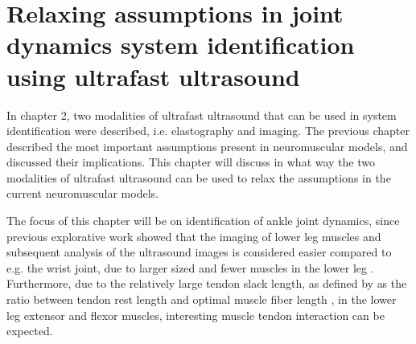\chapter{Relaxing assumptions in joint dynamics system identification using ultrafast ultrasound}
\label{chap:remove_assumptions}

In chapter 2, two modalities of ultrafast ultrasound that can be used in system identification were described, i.e. elastography and imaging. The previous chapter described the most important assumptions present in neuromuscular models, and discussed their implications. This chapter will discuss in what way the two modalities of ultrafast ultrasound can be used to relax the assumptions in the current neuromuscular models.

The focus of this chapter will be on identification of ankle joint dynamics, since previous explorative work showed that the imaging of lower leg muscles and subsequent analysis of the ultrasound images is considered easier compared to e.g. the wrist joint, due to larger sized and fewer muscles in the lower leg \cite{ossenkoppele_ultrasound_2017}. Furthermore, due to the relatively large tendon slack length, as defined by \citeauthor{zajac_muscle_1989} as the ratio between tendon rest length and optimal muscle fiber length \cite{zajac_muscle_1989}, in the lower leg extensor and flexor muscles, interesting muscle tendon interaction can be expected.


